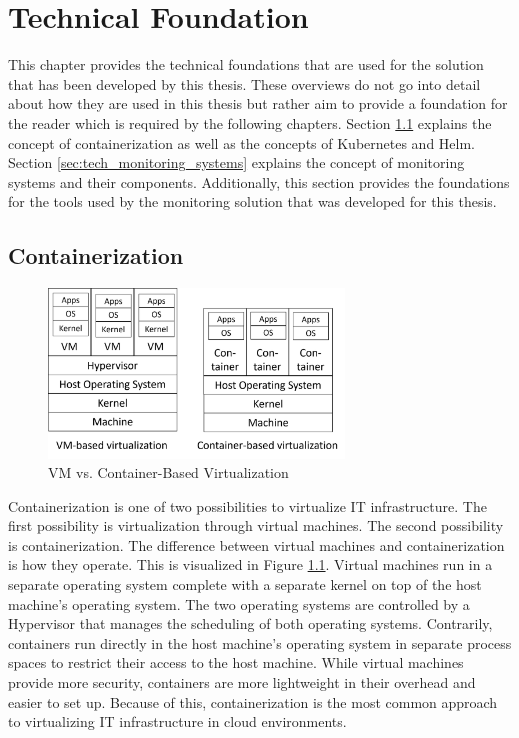 \chapter{Technical Foundation}
\label{cha:technical_foundation}

This chapter provides the technical foundations that are used for the solution that has been developed by this thesis.
These overviews do not go into detail about how they are used in this thesis but rather aim to provide
a foundation for the reader which is required by the following chapters.
Section \ref{sec:tech_containerization} explains the concept of containerization as well as the concepts of Kubernetes and Helm.
Section \ref{sec:tech_monitoring_systems} explains the concept of monitoring systems and their components.
Additionally, this section provides the foundations for the tools used by the monitoring solution that was developed for this thesis.

\section{Containerization}
\label{sec:tech_containerization}

\begin{figure}[tb]
	\centering
	\includegraphics[width=0.7\textwidth]{figures/vm_container_virtualization.png}
	\caption{VM vs. Container-Based Virtualization \cite{CM-W-CON}}
	\label{fig:vm_container_virtualization}
\end{figure}

Containerization is one of two possibilities to virtualize IT infrastructure.
The first possibility is virtualization through virtual machines.
The second possibility is containerization. The difference between virtual machines
and containerization is how they operate. This is visualized in Figure \ref{fig:vm_container_virtualization}.
Virtual machines run in a separate operating system complete with a separate kernel on top of the host machine's
operating system. The two operating systems are controlled by a Hypervisor that manages the scheduling of both
operating systems. Contrarily, containers run directly in the host machine's operating system
in separate process spaces to restrict their access to the host machine.
While virtual machines provide more security, containers are more lightweight in their overhead
and easier to set up. Because of this, containerization is the most common approach to virtualizing
IT infrastructure in cloud environments.

